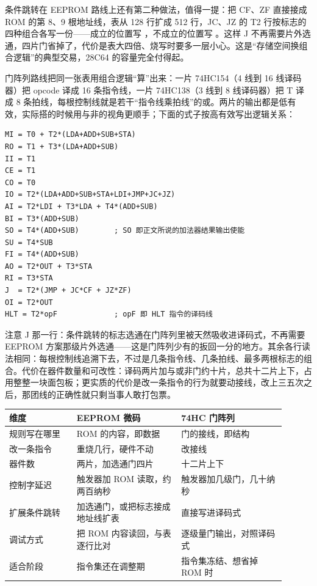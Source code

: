 条件跳转在 EEPROM 路线上还有第二种做法，值得一提：把 CF、ZF 直接接成 ROM 的第 8、9 根地址线，表从 128 行扩成 512 行，JC、JZ 的 T2 行按标志的四种组合各写一份——成立的位置写 ，不成立的位置写 。这样 J 不再需要片外选通，四片门省掉了，代价是表大四倍、烧写时要多一层小心。这是“存储空间换组合逻辑”的典型交易，28C64 的容量完全付得起。

门阵列路线把同一张表用组合逻辑“算”出来：一片 74HC154（4 线到 16 线译码器）把 opcode 译成 16 条指令线，一片 74HC138（3 线到 8 线译码器）把 T 译成 8 条拍线，每根控制线就是若干“指令线乘拍线”的或。两片的输出都是低有效，实际搭的时候用与非的视角更顺手；下面的式子按高有效写出逻辑关系：

\begin{lstlisting}
MI = T0 + T2*(LDA+ADD+SUB+STA)
RO = T1 + T3*(LDA+ADD+SUB)
II = T1
CE = T1
CO = T0
IO = T2*(LDA+ADD+SUB+STA+LDI+JMP+JC+JZ)
AI = T2*LDI + T3*LDA + T4*(ADD+SUB)
BI = T3*(ADD+SUB)
SO = T4*(ADD+SUB)        ; SO 即正文所说的加法器结果输出使能
SU = T4*SUB
FI = T4*(ADD+SUB)
AO = T2*OUT + T3*STA
RI = T3*STA
J  = T2*(JMP + JC*CF + JZ*ZF)
OI = T2*OUT
HLT = T2*opF             ; opF 即 HLT 指令的译码线
\end{lstlisting}

注意 J 那一行：条件跳转的标志选通在门阵列里被天然吸收进译码式，不再需要 EEPROM 方案那级片外选通——这是门阵列少有的扳回一分的地方。其余各行读法相同：每根控制线追溯下去，不过是几条指令线、几条拍线、最多两根标志的组合。代价在器件数量和可改性：译码两片加与或非门约十片，总共十二片上下，占用整整一块面包板；更实质的代价是改一条指令的行为就要动接线，改上三五次之后，那团线的正确性就只剩当事人敢打包票。

\begin{longtable}{L{0.22\linewidth}L{0.34\linewidth}L{0.34\linewidth}}
\toprule
维度 & EEPROM 微码 & 74HC 门阵列 \\
\midrule
规则写在哪里 & ROM 的内容，即数据 & 门的接线，即结构 \\\tablerowrule
改一条指令 & 重烧几行，硬件不动 & 改接线 \\\tablerowrule
器件数 & 两片，加选通门四片 & 十二片上下 \\\tablerowrule
控制字延迟 & 触发器加 ROM 读取，约两百纳秒 & 触发器加几级门，几十纳秒 \\\tablerowrule
扩展条件跳转 & 加选通门，或把标志接成地址线扩表 & 直接写进译码式 \\\tablerowrule
调试方式 & 把 ROM 内容读回，与表逐行比对 & 逐级量门输出，对照译码式 \\\tablerowrule
适合阶段 & 指令集还在调整期 & 指令集冻结、想省掉 ROM 时 \\
\bottomrule
\end{longtable}

